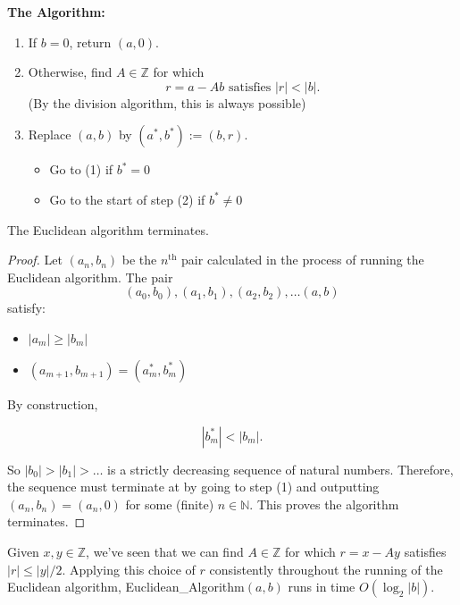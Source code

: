 \documentclass[11pt]{article}
\begin{document}
\textbf{The Algorithm:}
\begin{enumerate}
    \item If $b = 0$, return $(a, 0)$.
    \item Otherwise, find $A \in \mathbb{Z}$ for which
          \[
              r = a - Ab \text{ satisfies } |r| < |b|.
          \]
          (By the division algorithm, this is always possible)
    \item Replace $(a, b)$ by $(a^*, b^*) := (b, r)$.
          \begin{itemize}
              \item Go to (1) if $b^* = 0$
              \item Go to the start of step (2) if $b^* \neq 0$
          \end{itemize}
\end{enumerate}

\begin{proposition} The Euclidean algorithm terminates.
\end{proposition}
\begin{proof}Let $(a_n, b_n)$ be the $n^{\text{th}}$ pair calculated in the process of running the Euclidean algorithm. The pair
    \[
        (a_0, b_0), (a_1, b_1), (a_2, b_2), \ldots (a, b)
    \]
    satisfy:
    \begin{itemize}
        \item $|a_m| \geq |b_m|$
        \item $(a_{m+1}, b_{m+1}) = (a_m^*, b_m^*)$
    \end{itemize}

    By construction,

    \[
        |b_m^*| < |b_m|.
    \]

    So $|b_0| > |b_1| > \ldots$ is a strictly decreasing sequence of natural
    numbers. Therefore, the sequence must terminate at by going to step (1) and
    outputting $(a_n, b_n) = (a_n, 0)$ for some (finite) $n \in \mathbb{N}$. This
    proves the algorithm terminates.
\end{proof}
\begin{remark} Given $x, y \in \mathbb{Z}$, we've seen that we can find $A \in \mathbb{Z}$ for which $r = x - Ay$ satisfies $|r| \leq |y|/2$. Applying this choice of $r$ consistently throughout the running of the Euclidean algorithm, Euclidean\_Algorithm$(a, b)$ runs in time $O(\log_2 |b|)$.
\end{remark}
\end{document}
